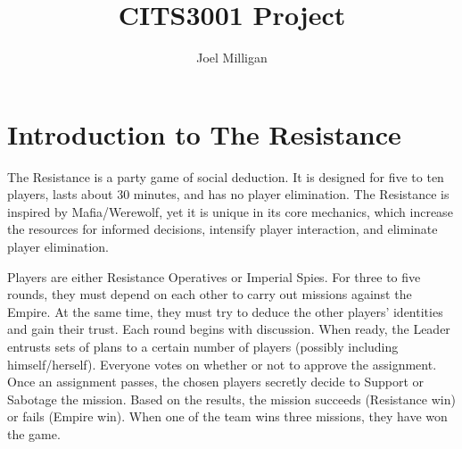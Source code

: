 \documentclass[a4paper]{article}
\title{CITS3001 Project}
\author{Joel Milligan}
\begin{document}
\setcounter{tocdepth}{2}
\setcounter{secnumdepth}{2}

\maketitle
\tableofcontents

\newpage
\section{Introduction to The Resistance}
The Resistance is a party game of social deduction.
It is designed for five to ten players, lasts about 30 minutes, and has no player elimination.
The Resistance is inspired by Mafia/Werewolf, yet it is unique in its core mechanics,
which increase the resources for informed decisions, intensify player interaction, and eliminate player elimination.

Players are either Resistance Operatives or Imperial Spies.
For three to five rounds, they must depend on each other to carry out missions against the Empire.
At the same time, they must try to deduce the other players’ identities and gain their trust.
Each round begins with discussion.
When ready, the Leader entrusts sets of plans to a certain number of players (possibly including himself/herself).
Everyone votes on whether or not to approve the assignment.
Once an assignment passes, the chosen players secretly decide to Support or Sabotage the mission.
Based on the results, the mission succeeds (Resistance win) or fails (Empire win).
When one of the team wins three missions, they have won the game. \cite{BoardGameGeek}



\end{document}

